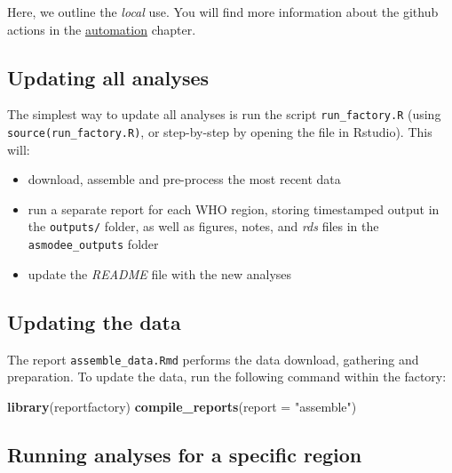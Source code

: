 \documentclass[]{book}
\newenvironment{Shaded}{\begin{snugshade}}{\end{snugshade}}
\newcommand{\DataTypeTok}[1]{\textcolor[rgb]{0.13,0.29,0.53}{#1}}
\newcommand{\KeywordTok}[1]{\textcolor[rgb]{0.13,0.29,0.53}{\textbf{#1}}}
\newcommand{\NormalTok}[1]{#1}
\newcommand{\StringTok}[1]{\textcolor[rgb]{0.31,0.60,0.02}{#1}}
\providecommand{\tightlist}{%
  \setlength{\itemsep}{0pt}\setlength{\parskip}{0pt}}
\begin{document}
Here, we outline the \emph{local} use. You will find more information about the
github actions in the \protect\hyperlink{automation}{automation} chapter.

\hypertarget{updating-all-analyses}{%
\subsection{Updating all analyses}\label{updating-all-analyses}}

The simplest way to update all analyses is run the script \texttt{run\_factory.R} (using
\texttt{source(run\_factory.R)}, or step-by-step by opening the file in Rstudio). This
will:

\begin{itemize}
\tightlist
\item
  download, assemble and pre-process the most recent data
\item
  run a separate report for each WHO region, storing timestamped output in the
  \texttt{outputs/} folder, as well as figures, notes, and \emph{rds} files in the
  \texttt{asmodee\_outputs} folder
\item
  update the \emph{README} file with the new analyses
\end{itemize}

\hypertarget{updating-the-data}{%
\subsection{Updating the data}\label{updating-the-data}}

The report \texttt{assemble\_data.Rmd} performs the data download, gathering and
preparation. To update the data, run the following command within the factory:

\begin{Shaded}
\begin{Highlighting}[]

\KeywordTok{library}\NormalTok{(reportfactory)}
\KeywordTok{compile_reports}\NormalTok{(}\DataTypeTok{report =} \StringTok{"assemble"}\NormalTok{)}
\end{Highlighting}
\end{Shaded}

\hypertarget{running-analyses-for-a-specific-region}{%
\subsection{Running analyses for a specific region}\label{running-analyses-for-a-specific-region}}
\end{document}

